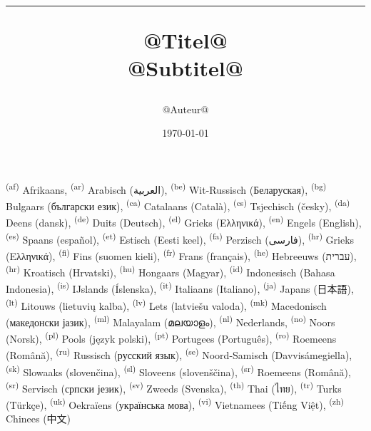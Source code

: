\documentclass[onecolumn,a4paper,10pt]{report}
\begin{document}
\sffamily
\raggedbottom
\title{\color{kleur}\bfseries\Huge \begin{shaded*} \hrule @Titel@ %
\\[1ex] \large @Subtitel@ %
\end{shaded*}}
\author{\color{kleur}@Auteur@}
\vfill
\date{\color{kleur}\today{}}

\maketitle

\setcounter{page}{1}

\tableofcontents
\newpage
\setcounter{page}{1}
\textsuperscript{(af)}  Afrikaans,
\textsuperscript{(ar)} Arabisch (\foreignlanguage{arabic}{العربية}),
\textsuperscript{(be)}  Wit-Russisch (Беларуская),
\textsuperscript{(bg)}  Bulgaars (български език),
\textsuperscript{(ca)} Catalaans (Català),
\textsuperscript{(cs)}  Tsjechisch (česky),
\textsuperscript{(da)}  Deens (dansk),
\textsuperscript{(de)}  Duits (Deutsch),
\textsuperscript{(el)}  Grieks (Ελληνικά),
\textsuperscript{(en)}  Engels (English),
\textsuperscript{(es)}  Spaans (español),
\textsuperscript{(et)}  Estisch (Eesti keel),
\textsuperscript{(fa)}  Perzisch (\foreignlanguage{persian}{فارسی}),
\textsuperscript{(hr)}  Grieks (Ελληνικά),
\textsuperscript{(fi)}  Fins (suomen kieli),
\textsuperscript{(fr)}  Frans (français),
\textsuperscript{(he)}  Hebreeuws (עברית),
\textsuperscript{(hr)}  Kroatisch (Hrvatski),
\textsuperscript{(hu)}  Hongaars (Magyar),
\textsuperscript{(id)}  Indonesisch (Bahasa Indonesia),
\textsuperscript{(is)}  IJslands (Íslenska),
\textsuperscript{(it)}  Italiaans (Italiano),
\textsuperscript{(ja)}  Japans (日本語),
\textsuperscript{(lt)}  Litouws (lietuvių kalba),
\textsuperscript{(lv)}  Lets (latviešu valoda),
\textsuperscript{(mk)} Macedonisch (македонски јазик),
\textsuperscript{(ml)} Malayalam (മലയാളം),
\textsuperscript{(nl)}  Nederlands,
\textsuperscript{(no)}  Noors (Norsk),
\textsuperscript{(pl)}  Pools (język polski),
\textsuperscript{(pt)}  Portugees (Português),
\textsuperscript{(ro)}  Roemeens (Română),
\textsuperscript{(ru)}  Russisch (русский язык),
\textsuperscript{(se)} Noord-Samisch (Davvisámegiella),
\textsuperscript{(sk)}  Slowaaks (slovenčina),
\textsuperscript{(sl)}  Sloveens (slovenščina),
\textsuperscript{(sr)}  Roemeens (Română),
\textsuperscript{(sr)}  Servisch (српски језик),
\textsuperscript{(sv)}  Zweeds (Svenska),
\textsuperscript{(th)}  Thai (\foreignlanguage{thai}{ไทย}),
\textsuperscript{(tr)}  Turks (Türkçe),
\textsuperscript{(uk)}  Oekraïens (українська мова),
\textsuperscript{(vi)}  Vietnamees (Tiếng Việt),
\textsuperscript{(zh)}  Chinees (中文)

\newpage

\end{document}

